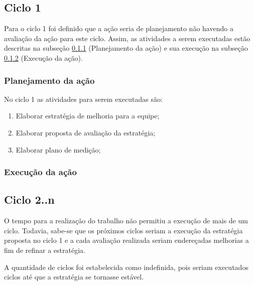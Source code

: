 \subsection{Ciclo 1}

	Para o ciclo 1 foi definido que a ação seria de planejamento não havendo a avaliação da ação para este ciclo. Assim, as atividades a serem
	executadas estão descritas na subseção \ref{sub:planejamento} (Planejamento da ação) e sua execução na subseção \ref{sub:execucao} (Execução da ação).

	\subsubsection{Planejamento da ação}
		\label{sub:planejamento}

		No ciclo 1 as atividades para serem executadas são:

		\begin{enumerate}

			\item Elaborar estratégia de melhoria para a equipe;

			\item Elaborar proposta de avaliação da estratégia;

			\item Elaborar plano de medição;


		\end{enumerate}


	\subsubsection{Execução da ação}
		\label{sub:execucao}




\subsection{Ciclo 2..n}

	O tempo para a realização do trabalho não permitiu a execução de mais de um ciclo. Todavia,
	sabe-se que os próximos ciclos seriam a execução da estratégia proposta no ciclo 1 e a cada avaliação realizada
	seriam endereçadas melhorias a fim de refinar a estratégia.

	A quantidade de ciclos foi estabelecida como indefinida, pois seriam executados ciclos até que a estratégia 
	se tornasse estável.

